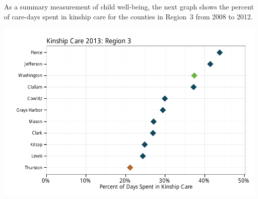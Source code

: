 \documentclass{article}\usepackage{graphicx, color}
\makeatletter
\def\maxwidth{ %
  \ifdim\Gin@nat@width>\linewidth
    \linewidth
  \else
    \Gin@nat@width
  \fi
}
\newenvironment{knitrout}{}{} %
\makeatother
\begin{document}
As a summary measurement of child well-being, the next graph shows the percent of care-days spent in kinship care for the counties in Region~3 from 2008 to 2012.
\nopagebreak[3]
\begin{knitrout}
\color{fgcolor}

{\centering \includegraphics[width=\maxwidth]{figure/ooh_wb} 

}



\end{knitrout}
\end{document}
